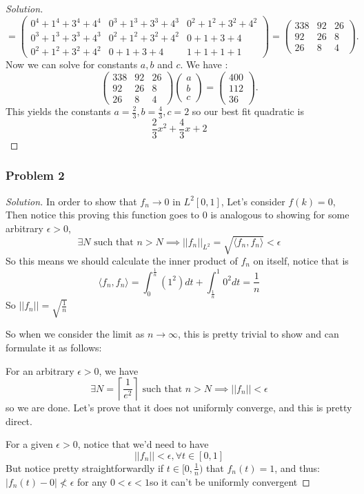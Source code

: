 \documentclass[11pt]{article}
\newcommand{\1}{\mathbf{1}}
\theoremstyle{definition}
\newenvironment{solution}{\begin{proof}[Solution]}{\end{proof}}
\begin{document}
\begin{solution}
\[
=
\begin{pmatrix}
0^4 + 1^4 + 3^4 + 4^4
&
0^3 + 1^3 + 3^3 + 4^3
&
0^2 + 1^2 + 3^2 + 4^2
\\
0^3 + 1^3 + 3^3 + 4^3
&
0^2 + 1^2 + 3^2 + 4^2
&
0 + 1 + 3 + 4
\\
0^2 + 1^2 + 3^2 + 4^2
&
0 + 1 + 3 + 4
&
1 + 1 + 1 + 1
\end{pmatrix}
=
\begin{pmatrix}
338 & 92 & 26 \\
92 & 26 & 8 \\
26 & 8 & 4
\end{pmatrix}.
\]
Now we can solve for constants \(a, b\) and \(c\).
We have :
\[
\begin{pmatrix}
338 & 92 & 26\\
92 & 26 & 8\\
26 & 8 & 4
\end{pmatrix}
\begin{pmatrix}
a\\
b\\
c
\end{pmatrix}
=
\begin{pmatrix}
400\\
112\\
36
\end{pmatrix}.
\]
This yields the constants \(a = \frac{2}{3}, b = \frac{4}{3}, c = 2\)
so our best fit quadratic is \[\frac{2}{3}x^2 + \frac{4}{3}x + 2\]
\end{solution}
\subsubsection*{Problem 2}
\begin{solution}
    In order to show that \(f_n \rightarrow 0\) in \(L^2[0, 1]\), 
    Let's consider \(f(k) = 0\), Then notice this proving this function goes to 0 is
    analogous to showing for some arbitrary \(\epsilon > 0\), \[\exists N  \text{ such
    that } n > N \implies  ||f_n||_{L^2}= \sqrt{\langle f_n, f_n\rangle} < \epsilon \]
    So this means we should calculate the inner product of \(f_n\) on itself, notice that
    is 
    \[\langle f_n, f_n \rangle  = \int_{0}^{\frac{1}{n}}(1^2)dt + \int_{\frac{1}{n}}^{1}
    0^2 dt = \frac{1}{n}\]
    So \(||f_n|| = \sqrt{\frac{1}{n}}\)
    \par So when we consider the limit as \(n \rightarrow \infty\), this is pretty trivial
    to show and can formulate it as follows:
    \par    For an  arbitrary \(\epsilon > 0\), we have \[\exists N = \left\lceil\frac{1}{e^2}\right\rceil
    \text{ such that } n > N \implies ||f_n|| < \epsilon \]
    so we are done.
    Let's prove that it does not uniformly converge, and this is pretty direct.
\par    For a given \(\epsilon > 0\), notice that we'd need to have \[||f_n|| < \epsilon, \forall t \in
[0,1] \]
But notice pretty straightforwardly  if \(t \in [0,\frac{1}{n})\) that \(f_n(t) = 1\), and
thus: \(|f_n(t) - 0| \not< \epsilon\) for any \(0 < \epsilon < 1\)so it can't be uniformly convergent
\end{solution}
\end{document}
